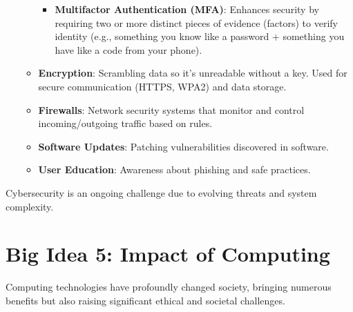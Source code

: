 \documentclass[11pt,oneside]{book}
\begin{document}
\begin{itemize}
\begin{itemize}
\begin{itemize}
                    \item \textbf{Multifactor Authentication (MFA)}: Enhances security by requiring two or more distinct pieces of evidence (factors) to verify identity (e.g., something you know like a password + something you have like a code from your phone).
                \end{itemize}
            \item \textbf{Encryption}: Scrambling data so it's unreadable without a key. Used for secure communication (HTTPS, WPA2) and data storage.
            \item \textbf{Firewalls}: Network security systems that monitor and control incoming/outgoing traffic based on rules.
            \item \textbf{Software Updates}: Patching vulnerabilities discovered in software.
            \item \textbf{User Education}: Awareness about phishing and safe practices.
        \end{itemize}
\end{itemize}
Cybersecurity is an ongoing challenge due to evolving threats and system complexity.

\chapter{Big Idea 5: Impact of Computing}
\label{chap:impact_computing}
Computing technologies have profoundly changed society, bringing numerous benefits but also raising significant ethical and societal challenges.
\end{document}
